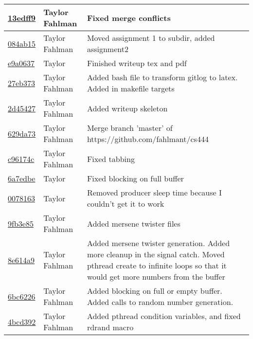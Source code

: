 \begin{tabular}{l l l}
\href{https://github.com/fahlmant/cs444/commit/13edff973f75105ee082af2453bb0ea1789c6823}{13edff9} & Taylor Fahlman & Fixed merge conflicts\\\hline
\href{https://github.com/fahlmant/cs444/commit/084ab1563492ad141bbbf835df613426e6070df2}{084ab15} & Taylor Fahlman & Moved assignment 1 to subdir, added assignment2\\\hline
\href{https://github.com/fahlmant/cs444/commit/e9a06375c5e5ee5232d5a3a71fa1dd1ac336b7cc}{e9a0637} & Taylor & Finished writeup tex and pdf\\\hline
\href{https://github.com/fahlmant/cs444/commit/27eb37349447092eec979e1d09531408f38ac661}{27eb373} & Taylor Fahlman & Added bash file to transform gitlog to latex. Added in makefile targets\\\hline
\href{https://github.com/fahlmant/cs444/commit/2d454270c6b79091f4c1363da7185e3ffbcb2301}{2d45427} & Taylor Fahlman & Added writeup skeleton\\\hline
\href{https://github.com/fahlmant/cs444/commit/629da73d1a287be9db4919d9bc27c987acfb7128}{629da73} & Taylor Fahlman & Merge branch 'master' of https://github.com/fahlmant/cs444\\\hline
\href{https://github.com/fahlmant/cs444/commit/c96174c136e9194fd83f4d5fee5927432468fdfd}{c96174c} & Taylor Fahlman & Fixed tabbing\\\hline
\href{https://github.com/fahlmant/cs444/commit/6a7edbe421fb5e53a9a847a09117500c1ca1482e}{6a7edbe} & Taylor & Fixed blocking on full buffer\\\hline
\href{https://github.com/fahlmant/cs444/commit/007816390983ac7d562e8f9d4d31ff6abc7c40c8}{0078163} & Taylor & Removed producer sleep time because I couldn't get it to work\\\hline
\href{https://github.com/fahlmant/cs444/commit/9fb3e850a20f58cd174a80bf580c150ebb8a8860}{9fb3e85} & Taylor Fahlman & Added mersene twister files\\\hline
\href{https://github.com/fahlmant/cs444/commit/8e614a90d9b3adfedea1214253801c36f17c6aea}{8e614a9} & Taylor Fahlman & Added mersene twister generation. Added more cleanup in the signal catch. Moved pthread create to infinite loops so that it would get more numbers from the buffer\\\hline
\href{https://github.com/fahlmant/cs444/commit/6bc6226e01a9a1302c741331cce8ab8256f399ce}{6bc6226} & Taylor Fahlman & Added blocking on full or empty buffer. Added calls to random number generation.\\\hline
\href{https://github.com/fahlmant/cs444/commit/4bcd392bf2941eb49cc82229be9495cd4c9f62ee}{4bcd392} & Taylor Fahlman & Added pthread condition variables, and fixed rdrand macro\\\hline

\end{tabular}
